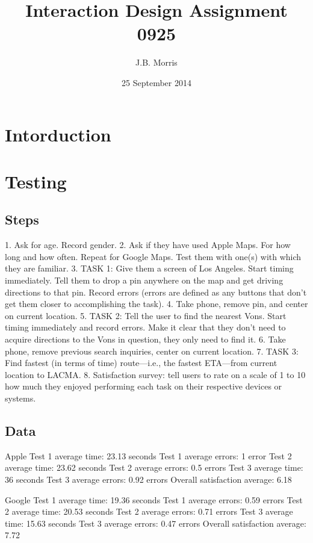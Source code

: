 \documentclass[12pt, oneside]{article}
\title{Interaction Design Assignment 0925}
\author{J.B. Morris}
\date{25 September 2014}
\begin{document}
\maketitle


\section{Intorduction}
\section{Testing}
\subsection{Steps}
1. Ask for age. Record gender.
2. Ask if they have used Apple Maps. For how long and how often. Repeat for Google Maps. Test them with one(s) with which they are familiar.
3. TASK 1: Give them a screen of Los Angeles. Start timing immediately. Tell them to drop a pin anywhere on the map and get driving directions to that pin. Record errors (errors are defined as any buttons that don't get them closer to accomplishing the task).
4. Take phone, remove pin, and center on current location.
5. TASK 2: Tell the user to find the nearest Vons. Start timing immediately and record errors. Make it clear that they don't need to acquire directions to the Vons in question, they only need to find it.
6. Take phone, remove previous search inquiries, center on current location.
7. TASK 3: Find fastest (in terms of time) route—i.e., the fastest ETA—from current location to LACMA.
8. Satisfaction survey: tell users to rate on a scale of 1 to 10 how much they enjoyed performing each task on their respective devices or systems.

\subsection{Data}

Apple
Test 1 average time: 23.13 seconds
Test 1 average errors: 1 error
Test 2 average time: 23.62 seconds
Test 2 average errors: 0.5 errors 
Test 3 average time: 36 seconds
Test 3 average errors: 0.92 errors
Overall satisfaction average: 6.18

Google
Test 1 average time: 19.36 seconds
Test 1 average errors: 0.59 errors
Test 2 average time: 20.53 seconds
Test 2 average errors: 0.71 errors 
Test 3 average time: 15.63 seconds
Test 3 average errors: 0.47 errors
Overall satisfaction average: 7.72
\end{document}
